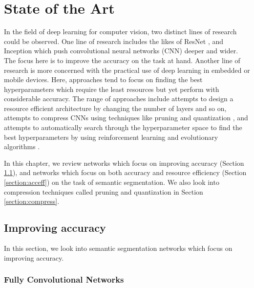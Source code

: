 
\chapter{State of the Art}

In the field of deep learning for computer vision, two distinct lines of research could be observed. One line of research includes the likes of ResNet \cite{DBLP:journals/corr/HeZRS15}, and Inception \cite{DBLP:journals/corr/SzegedyLJSRAEVR14} which push convolutional neural networks (CNN) deeper and wider. The focus here is to improve the accuracy on the task at hand. Another line of research is more concerned with the practical use of deep learning in embedded or mobile devices. Here, approaches tend to focus on finding the best hyperparameters which require the least resources but yet perform with considerable accuracy. The range of approaches include attempts to design a resource efficient architecture by changing the number of layers and so on, attempts to compress CNNs using techniques like pruning \cite{DBLP:journals/corr/MolchanovTKAK16} and quantization \cite{DBLP:journals/corr/WuLWHC15}, and attempts to automatically search through the hyperparameter space to find the best hyperparameters by using reinforcement learning \cite{DBLP:journals/corr/ZophL16} and evolutionary algorithms \cite{DBLP:journals/corr/abs-1802-01548}. 

In this chapter, we review networks which focus on improving accuracy (Section \ref{section:impacc}), and networks which focus on both accuracy and resource efficiency (Section \ref{section:acceff}) on the task of semantic segmentation. We also look into compression techniques called pruning and quantization in Section \ref{section:compress}.


\section{Improving accuracy}
\label{section:impacc}

In this section, we look into semantic segmentation networks which focus on improving accuracy. 

\subsection{Fully Convolutional Networks}

